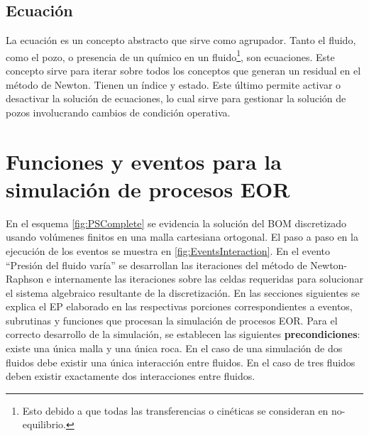 \subsection{Ecuación}\label{subsec:PS_Equation}
La ecuación es un concepto abstracto que sirve como agrupador. Tanto el fluido, como el pozo, o presencia de un químico en un fluido\footnote{Esto debido a que todas las transferencias o cinéticas se consideran en no-equilibrio.}, son ecuaciones. Este concepto sirve para iterar sobre todos los conceptos que generan un residual en el método de Newton. Tienen un índice y estado. Este último permite activar o desactivar la solución de ecuaciones, lo cual sirve para gestionar la solución de pozos involucrando cambios de condición operativa.


\section{Funciones y eventos para la simulación de procesos EOR}\label{subsec:PS_EOR}
En el esquema \ref{fig:PSComplete} se evidencia la solución del BOM discretizado usando volúmenes finitos en una malla cartesiana ortogonal. El paso a paso en la ejecución de los eventos se muestra en \ref{fig:EventsInteraction}.  En el evento ``Presión del fluido varía'' se desarrollan las iteraciones del método de Newton-Raphson e internamente las iteraciones sobre las celdas requeridas para solucionar el sistema algebraico resultante de la discretización. En las secciones siguientes se explica el EP elaborado en las respectivas porciones correspondientes a eventos, subrutinas y funciones que procesan la simulación de procesos EOR. Para el correcto desarrollo de la simulación, se establecen las siguientes \textbf{precondiciones}: existe una única malla y una única roca. En el caso de una simulación de dos fluidos debe existir una única interacción entre fluidos. En el caso de tres fluidos deben existir exactamente dos interacciones entre fluidos.



